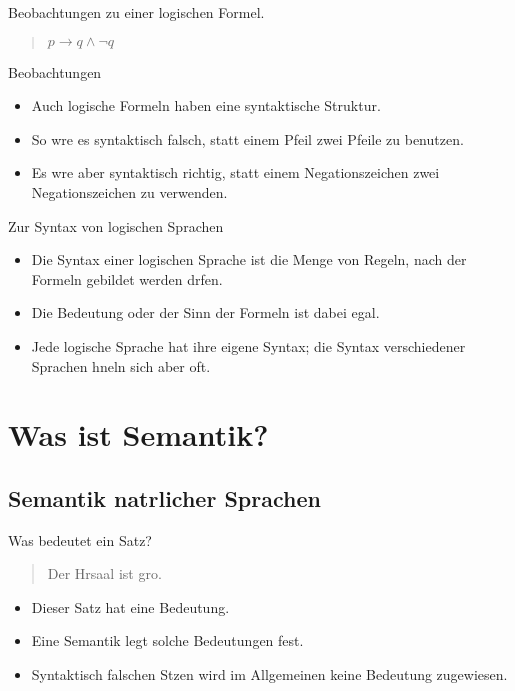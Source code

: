 \begin{frame}{Beobachtungen zu einer logischen Formel.}
  \begin{quotation}
    $p \to q \land \neg q$
  \end{quotation}

  \bigskip
  \begin{block}{Beobachtungen}
    \begin{itemize}
    \item Auch logische Formeln haben eine syntaktische Struktur.
    \item So wre es \alert{syntaktisch falsch}, statt einem Pfeil zwei
      Pfeile zu benutzen.
    \item Es wre aber \alert{syntaktisch richtig}, statt einem
      Negationszeichen zwei Negationszeichen zu verwenden.
    \end{itemize}
  \end{block}
\end{frame}

\begin{frame}{Zur Syntax von logischen Sprachen}
  \begin{itemize}
  \item Die \alert{Syntax} einer logischen Sprache ist die
    \alert{Menge von Regeln}, nach der Formeln gebildet werden 
    drfen.
  \item Die \alert{Bedeutung} oder der \alert{Sinn} der Formeln
    ist dabei egal.
  \item
    Jede logische Sprache hat ihre eigene Syntax; die Syntax
    verschiedener Sprachen hneln sich aber oft.
  \end{itemize}  
\end{frame}



\section{Was ist Semantik?}

\subsection[Semantik\protect\\ natrlicher Sprachen]{Semantik natrlicher Sprachen}

\begin{frame}{Was bedeutet ein Satz?}

  \begin{quotation}
    Der Hrsaal ist gro.
  \end{quotation}

  \bigskip
  \begin{itemize}
  \item Dieser Satz hat eine \alert{Bedeutung}.
  \item Eine \alert{Semantik} legt solche Bedeutungen fest.
  \item Syntaktisch falschen Stzen wird im Allgemeinen keine
    Bedeutung zugewiesen.
  \end{itemize}
\end{frame}

